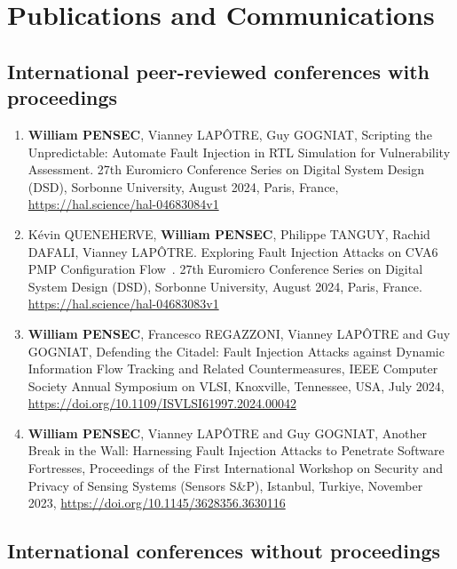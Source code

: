 \chapter{Publications and Communications}
\label{chapter:publi}
\section{International peer-reviewed conferences with proceedings}

\begin{enumerate}
    \item \textbf{William PENSEC}, Vianney LAPÔTRE, Guy GOGNIAT, Scripting the Unpredictable: Automate Fault Injection in RTL Simulation for Vulnerability Assessment. 27th Euromicro Conference Series on Digital System Design (DSD), Sorbonne University, August 2024, Paris, France, \url{https://hal.science/hal-04683084v1}
    \item Kévin QUENEHERVE, \textbf{William PENSEC}, Philippe TANGUY, Rachid DAFALI, Vianney LAPÔTRE. Exploring Fault Injection Attacks on CVA6 PMP Configuration Flow~\cite{QPTDL-24-dsd}. 27th Euromicro Conference Series on Digital System Design (DSD), Sorbonne University, August 2024, Paris, France. \url{https://hal.science/hal-04683083v1}
    \item \textbf{William PENSEC}, Francesco REGAZZONI, Vianney LAPÔTRE and Guy GOGNIAT, Defending the Citadel: Fault Injection Attacks against Dynamic Information Flow Tracking and Related Countermeasures, IEEE Computer Society Annual Symposium on VLSI, Knoxville, Tennessee, USA, July 2024, \url{https://doi.org/10.1109/ISVLSI61997.2024.00042}
    \item\textbf{William PENSEC}, Vianney LAPÔTRE and Guy GOGNIAT, Another Break in the Wall: Harnessing Fault Injection Attacks to Penetrate Software Fortresses, Proceedings of the First International Workshop on Security and Privacy of Sensing Systems (Sensors S\&P), Istanbul, Turkiye, November 2023, \url{https://doi.org/10.1145/3628356.3630116}
\end{enumerate}
\section{International conferences without proceedings}

